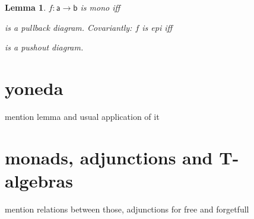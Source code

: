 \documentclass{article}
\newcommand{\ob}[1]{\mathsf{#1}} %
\newtheorem{lemma}[theorem]{Lemma}
\begin{document}
\begin{lemma}
	$f: \ob{a} \rightarrow \ob{b}$ is mono iff
	is a pullback diagram.
	Covariantly: $f$ is epi iff
	 is a pushout diagram.
\end{lemma}



\section{yoneda}
mention lemma and usual application of it

\section{monads, adjunctions and T-algebras}
mention relations between those, adjunctions for free and forgetfull 

\end{document}
